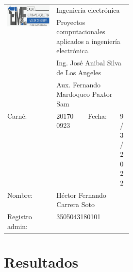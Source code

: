 \documentclass[12pt,letterpaper]{article}
\begin{document}

\begin{title}

\begin{table}[H]
\begin{center}
\begin{tabular}{|c|m{0.20\linewidth}|c|m{0.10\linewidth}|}
\multirow{4}{*}{\includegraphics[scale=0.3]{EIME.png}}                                                         & \multicolumn{3}{l}{Ingeniería electrónica}                                       \\
                                                                                & \multicolumn{3}{l}{Proyectos computacionales aplicados a ingeniería electrónica} \\
                                                                                & \multicolumn{3}{l}{Ing. José Anibal Silva de Los Angeles}                        \\
                                                                                & \multicolumn{3}{l}{Aux. Fernando Mardoqueo Paxtor Sam}                           \\ \hline 
	\multicolumn{1}{|l|}{Carné:} & 201700923 & Fecha: & \multicolumn{1}{l|}{9/3/2022}\\ 
	\hline 
	\multicolumn{1}{|l|}{Nombre:} & \multicolumn{3}{l|}{Héctor Fernando Carrera Soto} \\ 
	\hline 
	\multicolumn{1}{|l|}{Registro admin:} & \multicolumn{3}{l|}{3505043180101} \\ 
	\hline 
	\end{tabular} 
\end{center}
\end{table}

\end{title}


\section{Resultados}
\end{document}
